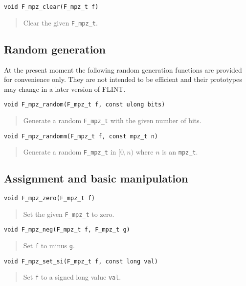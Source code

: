 \documentclass[a4paper,10pt]{article}
\newcommand{\code}{\lstinline}
\begin{document}
\begin{lstlisting}
void F_mpz_clear(F_mpz_t f)
\end{lstlisting}
\begin{quote}
Clear the given \code{F_mpz_t}.
\end{quote}

\subsection{Random generation}

At the present moment the following random generation functions are provided for convenience only. They are not intended to be efficient and their prototypes may change in a later version of FLINT.

\begin{lstlisting}
void F_mpz_random(F_mpz_t f, const ulong bits)
\end{lstlisting}
\begin{quote}
Generate a random \code{F_mpz_t} with the given number of bits.
\end{quote}

\begin{lstlisting}
void F_mpz_randomm(F_mpz_t f, const mpz_t n)
\end{lstlisting}
\begin{quote}
Generate a random \code{F_mpz_t} in $[0, n)$ where $n$ is an \code{mpz_t}.
\end{quote}

\subsection{Assignment and basic manipulation}

\begin{lstlisting}
void F_mpz_zero(F_mpz_t f)
\end{lstlisting}
\begin{quote}
Set the given \code{F_mpz_t} to zero.
\end{quote}

\begin{lstlisting}
void F_mpz_neg(F_mpz_t f, F_mpz_t g)
\end{lstlisting}
\begin{quote}
Set \code{f} to minus \code{g}. 
\end{quote}

\begin{lstlisting}
void F_mpz_set_si(F_mpz_t f, const long val)
\end{lstlisting}
\begin{quote}
Set \code{f} to a signed long value \code{val}.
\end{quote}
\end{document}
